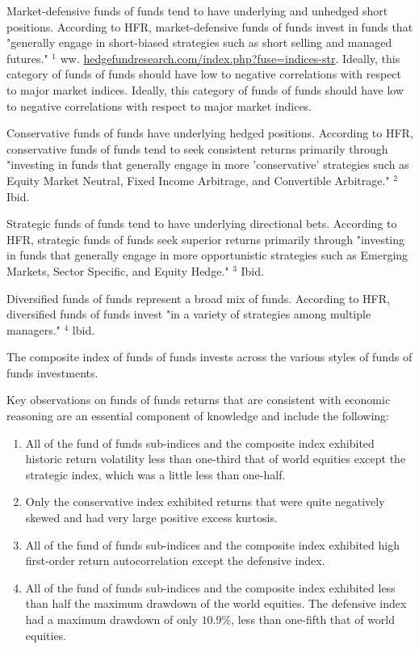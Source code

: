 \documentclass[11pt]{article}
\begin{document}
Market-defensive funds of funds tend to have underlying and unhedged short positions. According to HFR, market-defensive funds of funds invest in funds that "generally engage in short-biased strategies such as short selling and managed futures." ${ }^{1}$ ww. \href{http://hedgefundresearch.com/index.php?fuse=indices-str}{hedgefundresearch.com/index.php?fuse=indices-str}. Ideally, this category of funds of funds should have low to negative correlations with respect to major market indices. Ideally, this category of funds of funds should have low to negative correlations with respect to major market indices.

Conservative funds of funds have underlying hedged positions. According to HFR, conservative funds of funds tend to seek consistent returns primarily through "investing in funds that generally engage in more 'conservative' strategies such as Equity Market Neutral, Fixed Income Arbitrage, and Convertible Arbitrage." ${ }^{2}$ Ibid.

Strategic funds of funds tend to have underlying directional bets. According to HFR, strategic funds of funds seek superior returns primarily through "investing in funds that generally engage in more opportunistic strategies such as Emerging Markets, Sector Specific, and Equity Hedge." ${ }^{3}$ Ibid.

Diversified funds of funds represent a broad mix of funds. According to HFR, diversified funds of funds invest "in a variety of strategies among multiple managers." ${ }^{4}$ lbid.

The composite index of funds of funds invests across the various styles of funds of funds investments.

Key observations on funds of funds returns that are consistent with economic reasoning are an essential component of knowledge and include the following:

\begin{enumerate}
  \item All of the fund of funds sub-indices and the composite index exhibited historic return volatility less than one-third that of world equities except the strategic index, which was a little less than one-half.

  \item Only the conservative index exhibited returns that were quite negatively skewed and had very large positive excess kurtosis.

  \item All of the fund of funds sub-indices and the composite index exhibited high first-order return autocorrelation except the defensive index.

  \item All of the fund of funds sub-indices and the composite index exhibited less than half the maximum drawdown of the world equities. The defensive index had a maximum drawdown of only $10.9 \%$, less than one-fifth that of world equities.

\end{enumerate}
\end{document}
